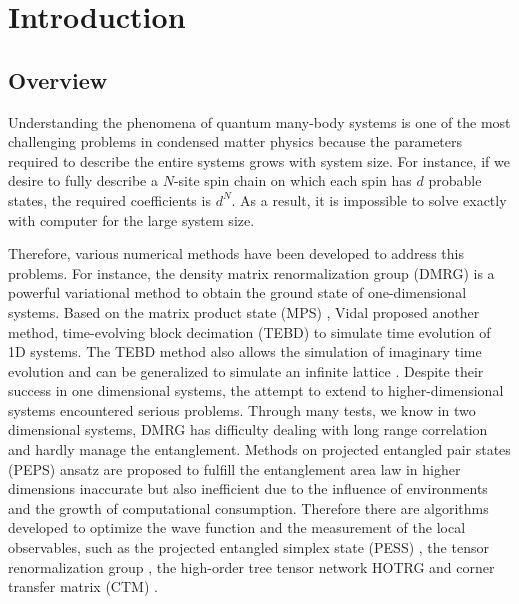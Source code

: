 \chapter{Introduction}
\label{chapter:Introduction}

\section{Overview}
\label{overview}

Understanding the phenomena of quantum many-body systems is one of the most challenging problems in condensed matter physics because the parameters required to describe the entire systems grows with system size. For instance, if we desire to fully describe a $N$-site spin chain on which each spin has $d$ probable states, the required coefficients is $d^N$. As a result, it is impossible to solve exactly with computer for the large system size.

Therefore, various numerical methods have been developed to address this problems. For instance, the density matrix renormalization group (DMRG) \cite{PhysRevLett.69.2863, PhysRevB.48.10345} is a powerful variational method to obtain the ground state of one-dimensional systems. Based on the matrix product state (MPS) \cite{PhysRevB.73.094423, PhysRevLett.75.3537}, Vidal proposed another method, time-evolving block decimation (TEBD) to simulate time evolution of 1D systems. The TEBD \cite{PhysRevLett.91.147902, PhysRevLett.93.040502} method also allows the simulation of imaginary time evolution and can be generalized to simulate an infinite lattice \cite{PhysRevLett.98.070201, PhysRevB.78.155117}. 
Despite their success in one dimensional systems, the attempt to extend to higher-dimensional systems encountered serious problems. Through many tests, we know in two dimensional systems, DMRG has difficulty dealing with long range correlation and hardly manage the entanglement. Methods  on projected entangled pair states (PEPS) \cite{PhysRevA.75.033605, jordan_studies_2011} ansatz are proposed to fulfill the entanglement area law in higher dimensions \cite{RevModPhys.82.277} \cite{} inaccurate but also inefficient due to the influence of environments and the growth of computational consumption. Therefore there are algorithms developed to optimize the wave function  and the measurement of the local observables, such as the projected entangled simplex state (PESS) \cite{PhysRevX.4.011025}, the tensor renormalization group \cite{PhysRevLett.99.120601,PhysRevB.78.205116,PhysRevB.80.155131}, the high-order tree tensor network HOTRG \cite{PhysRevB.86.045139} and corner transfer matrix (CTM) \cite{doi:10.1143/JPSJ.65.891,PhysRevB.80.094403}.

